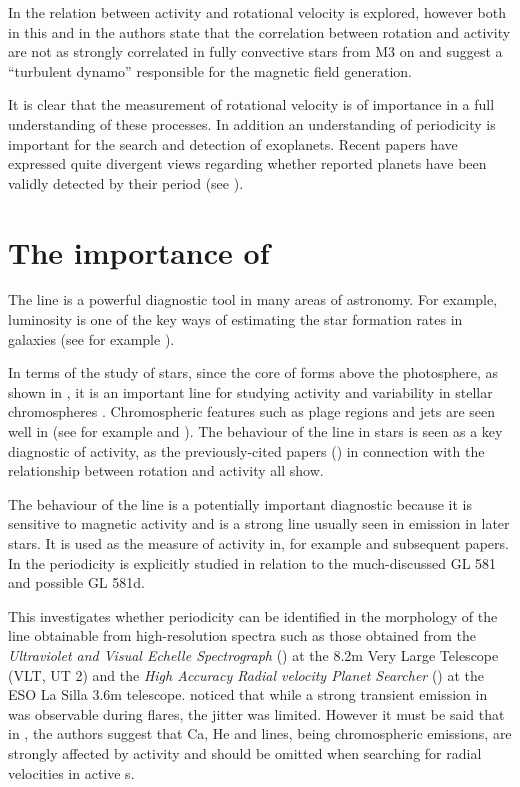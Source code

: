 In \citet{mohanty02} the relation between activity and rotational velocity is explored, however both in this and in
\citet{mohanty03} the authors state that the correlation between rotation and activity are not as strongly correlated in
fully convective stars from M3 on and suggest a ``turbulent dynamo'' responsible for the magnetic field generation.

It is clear that the measurement of rotational velocity is of importance in a full understanding of these processes. In
addition an understanding of periodicity is important for the search and detection of exoplanets. Recent papers have
expressed quite divergent views regarding whether reported planets have been validly detected by their period (see
\citealt{barnes13,robertson14,robertson14a,tuomi13aug,robertson15}). 

\section{The importance of {\ha}}
\protect\label{section:intohalpha}

The {\ha} line is a powerful diagnostic tool in many areas of astronomy. For example, {\ha} luminosity is one of the key
ways of estimating the star formation rates in galaxies (see for example \citet{rosagonzalez02}).

In terms of the study of stars, since the core of {\ha} forms above the photosphere, as shown in \citep{vernazza81}, it
is an important line for studying activity and variability in stellar chromospheres \citep{hall08}. Chromospheric
features such as plage regions and jets are seen well in {\ha} (see for example \citet{kneer10} and \citet{kuridze11}). 
The behaviour of the {\ha} line in {\rdwarf} stars is seen as a key diagnostic of activity, as the previously-cited
papers (\citealt{mohanty02, mohanty03, reiners08, schmidt14}) in connection with the relationship between rotation and
activity all show.

The behaviour of the {\ha} line is a potentially important diagnostic because it is sensitive to magnetic activity and
is a strong line usually seen in emission in later {\rdwarf} stars. It is used as the measure of activity in, for
example \citet{mohanty03} and subsequent papers. In \citet{hatzes15} the {\ha} periodicity is explicitly studied in
relation to the much-discussed GL 581 and possible GL 581d.

This {\paperorthesis} investigates whether periodicity can be identified in the morphology of the {\ha} line obtainable
from high-resolution spectra such as those obtained from the \textit{Ultraviolet and Visual Echelle Spectrograph}
({\uves}) at the 8.2m Very Large Telescope (VLT, UT 2) and the \textit{High Accuracy Radial velocity Planet Searcher}
({\harps}) at the ESO La Silla 3.6m telescope. \citet{barnes14} noticed that while a strong transient emission in {\ha}
was observable during flares, the jitter was limited. However it must be said that in \citet{reiners09}, the authors
suggest that Ca, He and {\ha} lines, being chromospheric emissions, are strongly affected by activity and should be
omitted when searching for radial velocities in active \rdwarf s.

